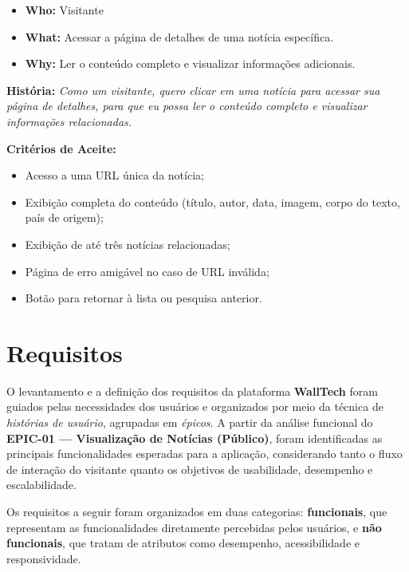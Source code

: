 \begin{itemize}
  \item \textbf{Who:} Visitante
  \item \textbf{What:} Acessar a página de detalhes de uma notícia específica.
  \item \textbf{Why:} Ler o conteúdo completo e visualizar informações adicionais.
\end{itemize}

\noindent \textbf{História:} \textit{Como um visitante, quero clicar em uma notícia para acessar sua página de detalhes, para que eu possa ler o conteúdo completo e visualizar informações relacionadas.}

\noindent \textbf{Critérios de Aceite:}
\begin{itemize}
  \item Acesso a uma URL única da notícia;
  \item Exibição completa do conteúdo (título, autor, data, imagem, corpo do texto, país de origem);
  \item Exibição de até três notícias relacionadas;
  \item Página de erro amigável no caso de URL inválida;
  \item Botão para retornar à lista ou pesquisa anterior.
\end{itemize}









\section{Requisitos}
\label{section:requisitos}

O levantamento e a definição dos requisitos da plataforma \textbf{WallTech} foram guiados pelas necessidades dos usuários e organizados por meio da técnica de \textit{histórias de usuário}, agrupadas em \textit{épicos}. A partir da análise funcional do \textbf{EPIC-01 — Visualização de Notícias (Público)}, foram identificadas as principais funcionalidades esperadas para a aplicação, considerando tanto o fluxo de interação do visitante quanto os objetivos de usabilidade, desempenho e escalabilidade.

Os requisitos a seguir foram organizados em duas categorias: \textbf{funcionais}, que representam as funcionalidades diretamente percebidas pelos usuários, e \textbf{não funcionais}, que tratam de atributos como desempenho, acessibilidade e responsividade.

